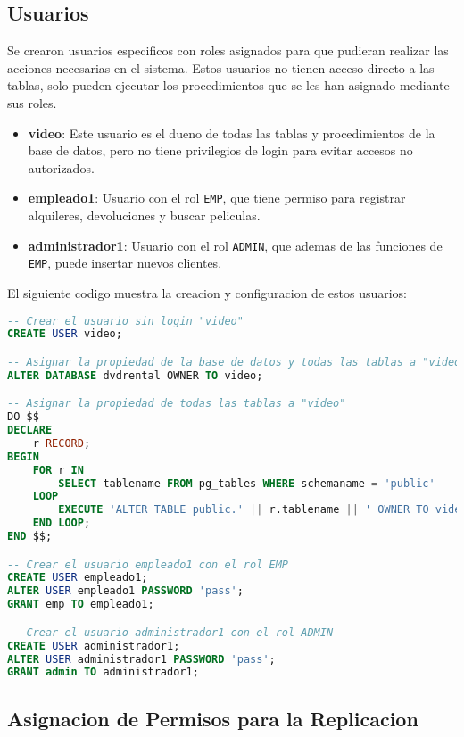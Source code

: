 \documentclass{article}
\begin{document}
\newpage
\subsection{Usuarios}

Se crearon usuarios especificos con roles asignados para que pudieran realizar las acciones necesarias en el sistema. Estos usuarios no tienen acceso directo a las tablas, solo pueden ejecutar los procedimientos que se les han asignado mediante sus roles.

\begin{itemize}
    \item \textbf{video}: Este usuario es el dueno de todas las tablas y procedimientos de la base de datos, pero no tiene privilegios de login para evitar accesos no autorizados.
    \item \textbf{empleado1}: Usuario con el rol \texttt{EMP}, que tiene permiso para registrar alquileres, devoluciones y buscar peliculas.
    \item \textbf{administrador1}: Usuario con el rol \texttt{ADMIN}, que ademas de las funciones de \texttt{EMP}, puede insertar nuevos clientes.
\end{itemize}

El siguiente codigo muestra la creacion y configuracion de estos usuarios:

\begin{lstlisting}[language=SQL]
-- Crear el usuario sin login "video"
CREATE USER video;

-- Asignar la propiedad de la base de datos y todas las tablas a "video"
ALTER DATABASE dvdrental OWNER TO video;

-- Asignar la propiedad de todas las tablas a "video"
DO $$ 
DECLARE
    r RECORD;
BEGIN
    FOR r IN 
        SELECT tablename FROM pg_tables WHERE schemaname = 'public' 
    LOOP
        EXECUTE 'ALTER TABLE public.' || r.tablename || ' OWNER TO video;';
    END LOOP;
END $$;

-- Crear el usuario empleado1 con el rol EMP
CREATE USER empleado1;
ALTER USER empleado1 PASSWORD 'pass';
GRANT emp TO empleado1;

-- Crear el usuario administrador1 con el rol ADMIN
CREATE USER administrador1;
ALTER USER administrador1 PASSWORD 'pass';
GRANT admin TO administrador1;
\end{lstlisting}

\newpage
\subsection{Asignacion de Permisos para la Replicacion}
\end{document}
